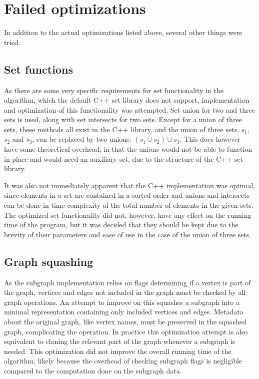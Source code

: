 \documentclass{article}
\begin{document}
	\section{Failed optimizations}
	In addition to the actual optimizations listed above, several other things were tried.

		\subsection{Set functions}
		As there are some very specific requirements for set functionality in the algorithm, which the default C++ set library does not support, implementation and optimization of this functionality was attempted.
		Set union for two and three sets is used, along with set intersects for two sets.
		Except for a union of three sets, these methods all exist in the C++ library, and the union of three sets, $s_1$, $s_2$ and $s_3$, can be replaced by two unions: $(s_1 \cup s_2) \cup s_3$.
		This does however have some theoretical overhead, in that the unions would not be able to function in-place and would need an auxiliary set, due to the structure of the C++ set library.

		It was also not immediately apparent that the C++ implementation was optimal, since elements in a set are contained in a sorted order and unions and intersects can be done in time complexity of the total number of elements in the given sets.
		The optimized set functionality did not, however, have any effect on the running time of the program, but it was decided that they should be kept due to the brevity of their parameters and ease of use in the case of the union of three sets.
		
		\subsection{Graph squashing}
		As the subgraph implementation relies on flags determining if a vertex is part of the graph, vertices and edges not included in the graph must be checked by all graph operations.
		An attempt to improve on this squashes a subgraph into a minimal representation containing only included vertices and edges.
		Metadata about the original graph, like vertex names, must be preserved in the squashed graph, complicating the operation.
		In practice this optimization attempt is also equivalent to cloning the relevant part of the graph whenever a subgraph is needed. This optimization did not improve the overall running time of the algorithm, likely because the overhead of checking subgraph flags is negligible compared to the computation done on the subgraph data.
\end{document}
